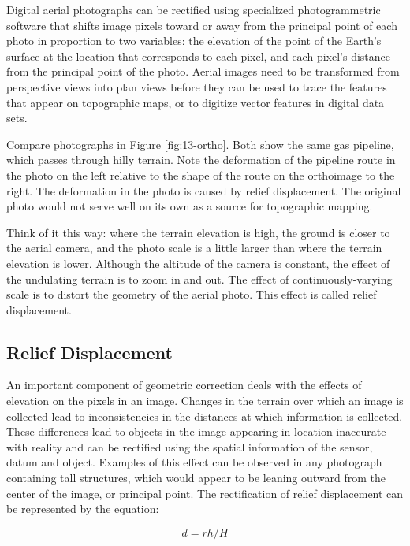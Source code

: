 \documentclass[
]{book}
\begin{document}
Digital aerial photographs can be rectified using specialized photogrammetric software that shifts image pixels toward or away from the principal point of each photo in proportion to two variables: the elevation of the point of the Earth's surface at the location that corresponds to each pixel, and each pixel's distance from the principal point of the photo. Aerial images need to be transformed from perspective views into plan views before they can be used to trace the features that appear on topographic maps, or to digitize vector features in digital data sets.

Compare photographs in Figure \ref{fig:13-ortho}. Both show the same gas pipeline, which passes through hilly terrain. Note the deformation of the pipeline route in the photo on the left relative to the shape of the route on the orthoimage to the right. The deformation in the photo is caused by relief displacement. The original photo would not serve well on its own as a source for topographic mapping.

Think of it this way: where the terrain elevation is high, the ground is closer to the aerial camera, and the photo scale is a little larger than where the terrain elevation is lower. Although the altitude of the camera is constant, the effect of the undulating terrain is to zoom in and out. The effect of continuously-varying scale is to distort the geometry of the aerial photo. This effect is called relief displacement.

\hypertarget{relief-displacement}{%
\subsection{Relief Displacement}\label{relief-displacement}}

An important component of geometric correction deals with the effects of elevation on the pixels in an image. Changes in the terrain over which an image is collected lead to inconsistencies in the distances at which information is collected. These differences lead to objects in the image appearing in location inaccurate with reality and can be rectified using
the spatial information of the sensor, datum and object. Examples of this effect can be observed in any photograph containing tall structures, which would appear to be leaning outward from the center of the image, or principal point. The rectification of relief displacement can be represented by the equation:

\begin{equation}
d = rh/H
\label{eq:ortho}
\end{equation}
\end{document}
